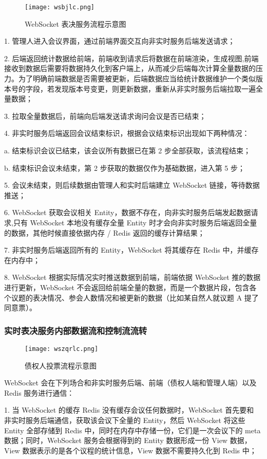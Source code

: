 \begin{figure}[!htp]
    \centering
    \texttt{[image: wsbjlc.png]}
    \caption{WebSocket 表决服务流程示意图}
    \label{fig:wsbjlc}
  \end{figure}

  1. 管理人进入会议界面，通过前端界面交互向非实时服务后端发送请求；

 2. 后端返回统计数据给前端，前端收到请求后将数据在前端渲染，生成视图,前端接收到数据后需要将数据持久化到客户端上，从而减少后端每次计算全量数据的压力。为了明确前端数据是否需要被更新，后端数据应当给统计数据维护一个类似版本号的字段，若发现版本号变更，则更新数据，重新从非实时服务后端拉取一遍全量数据；

3. 拉取全量数据后，前端向后端发送请求询问会议是否已结束；

4. 非实时服务后端返回会议结束标识，根据会议结束标识出现如下两种情况：

  \quad{}\quad{}a. 结束标识会议已结束，该会议所有数据已在第 2 步全部获取，该流程结束；
  
  \quad{}\quad{}b. 结束标识会议未结束，第 2 步获取的数据仅作为基础数据，进入第 5 步；
  
5. 会议未结束，则后续数据由管理人和实时后端建立 WebSocket 链接，等待数据推送；
  
6. WebSocket 获取会议相关 Entity，数据不存在，向非实时服务后端发起数据请求,只有 WebSocket 本地没有缓存全量 Entity 时才会向非实时服务后端返回全量的数据，其他时候直接依据内存 / Redis 返回的缓存计算结果；
  
7. 非实时服务后端返回所有的 Entity，WebSocket 将其缓存在 Redis 中，并缓存在内存中；
  
8. WebSocket 根据实际情况实时推送数据到前端，前端依据 WebSocket 推的数据进行更新，WebSocket 不会返回给前端全量的数据，而是一个数据片段，包含各个议题的表决情况、参会人数情况和被更新的数据（比如某自然人就议题 A 提了同意票）。

  \subsubsection{实时表决服务内部数据流和控制流流转}
  \begin{figure}[!htp]
    \centering
    \texttt{[image: wszqrlc.png]}
    \caption{债权人投票流程示意图}
    \label{fig:wszqrlc}
  \end{figure}

  WebSocket 会在下列场合和非实时服务后端、前端（债权人端和管理人端）以及 Redis 服务进行通信：

  1. 当 WebSocket 的缓存 Redis 没有缓存会议任何数据时，WebSocket 首先要和 非实时服务后端通信，获取该会议下全量的 Entity，然后 WebSocket 将这些 Entity 全部存储到 Redis 中，同时在内存中存储一份，它们是一次会议下的 meta 数据；同时，WebSocket 服务会根据得到的 Entity 数据形成一份 View 数据，View 数据表示的是各个议程的统计信息，View 数据不需要持久化到 Redis 中；
  
